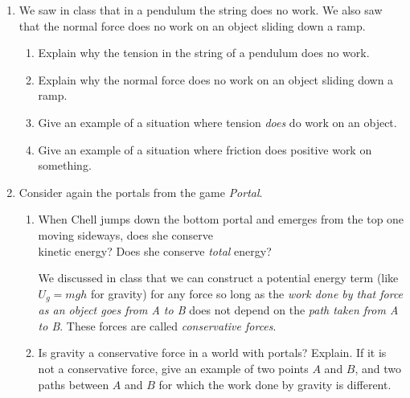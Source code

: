 \documentclass[12pt]{article}
\begin{document}
\Large
\centerline{}
\normalsize
\centerline{}

\begin{enumerate}

  \item{We saw in class that in a pendulum the string does no work. We also saw that the normal force does no work on an object sliding down a ramp.}
    \begin{enumerate}
      \item{Explain why the tension in the string of a pendulum does no work.}
      \item{Explain why the normal force does no work on an object sliding down a ramp.}
      \item{Give an example of a situation where tension {\it does} do work on an object.}
      \item{Give an example of a situation where friction does positive work on something.}
    \end{enumerate}

\item Consider again the portals from the game {\it Portal}. 

\begin{minipage}{0.7\textwidth} 
	
	\begin{enumerate}
		\item {When Chell jumps down the bottom portal and emerges from the top one moving sideways, does she conserve\\ kinetic energy? Does she conserve {\it total} energy?}
		
		We discussed in class that we can construct a potential energy term (like $U_g = mgh$ for gravity) for any force so long as the {\it work done by that force as an object goes from A to B} does not depend on the {\it path taken from A to B}. These forces are called {\it conservative forces}.
		\item {Is gravity a conservative force in a world with portals? Explain. If it is not a conservative force, give an example of two points $A$ and $B$, and two paths between $A$ and $B$ for which the work done by gravity is different.}
		
	\end{enumerate}
	

\end{minipage}
\end{enumerate}
\end{document}
